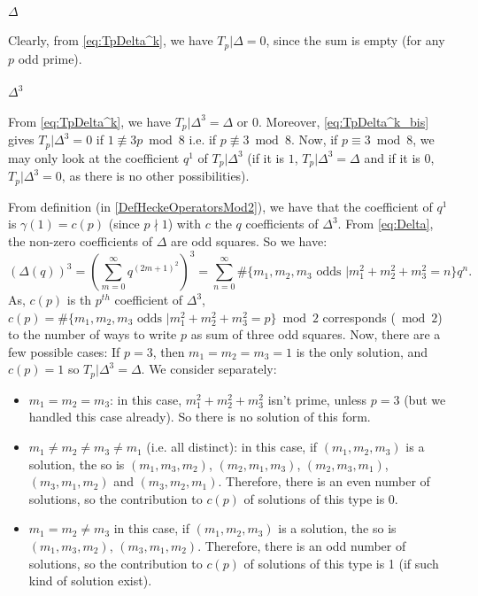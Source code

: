 \paragraph{$\Delta$}
Clearly, from \eqref{eq:TpDelta^k}, we have $T_p|\Delta = 0$, since the sum is empty (for any $p$ odd prime).

\paragraph{$\Delta^3$}
From \eqref{eq:TpDelta^k}, we have $T_p|\Delta^3 = \Delta \text{ or } 0$. Moreover, \eqref{eq:TpDelta^k_bis} gives $T_p|\Delta^3 = 0$ if $1 \not\equiv 3p \bmod 8$ i.e. if $p \not\equiv 3 \bmod 8$.
Now, if $p \equiv 3 \bmod 8$, we may only look at the coefficient $q^1$ of $T_p|\Delta^3$ (if it is $1$, $T_p|\Delta^3 = \Delta$ and if it is $0$, $T_p|\Delta^3 = 0$, as there is no other possibilities).

From definition (in \ref{DefHeckeOperatorsMod2}), we have that the coefficient of $q^1$ is $\gamma(1) = c(p)$ (since $p \nmid 1$) with $c$ the $q$ coefficients of $\Delta^3$.
From \eqref{eq:Delta}, the non-zero coefficients of $\Delta$ are odd squares.
So we have:
$$
\left( \Delta(q) \right)^3
= \left( \sum_{m=0}^{\infty} q^{(2m+1)^2} \right)^3
= \sum_{n=0}^{\infty} \#\{m_1, m_2, m_3 \text{ odds } | m_1^2 + m_2^2 + m_3^2 = n\} q^n.
$$
As, $c(p)$ is th $p^{th}$ coefficient of $\Delta^3$, $c(p) = \#\{m_1, m_2, m_3 \text{ odds } | m_1^2 + m_2^2 + m_3^2 = p\} \bmod 2$ corresponds ($\bmod 2$) to the number of ways to write $p$ as sum of three odd squares.
Now, there are a few possible cases:
If $p=3$, then $m_1=m_2=m_3=1$ is the only solution, and $c(p)=1$ so $T_p|\Delta^3=\Delta$.
We consider separately:
\begin{itemize}
	\item $m_1=m_2=m_3$: in this case, $m_1^2 + m_2^2 + m_3^2$ isn't prime, unless $p=3$ (but we handled this case already). So there is no solution of this form.
	\item $m_1 \neq m_2 \neq m_3 \neq m_1$ (i.e. all distinct): in this case, if $(m_1, m_2, m_3)$ is a solution, the so is $(m_1, m_3, m_2)$, $(m_2, m_1, m_3)$, $(m_2, m_3, m_1)$, $(m_3, m_1, m_2)$ and $(m_3, m_2, m_1)$. Therefore, there is an even number of solutions, so the contribution to $c(p)$ of solutions of this type is 0.
	\item $m_1 = m_2\neq m_3$ in this case, if $(m_1, m_2, m_3)$ is a solution, the so is $(m_1, m_3, m_2)$, $(m_3, m_1, m_2)$. Therefore, there is an odd number of solutions, so the contribution to $c(p)$ of solutions of this type is 1 (if such kind of solution exist).
\end{itemize}

